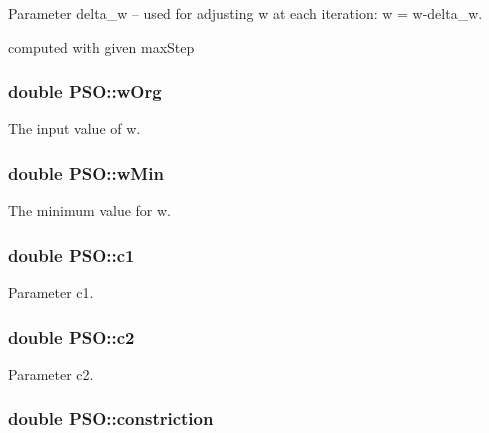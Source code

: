 Parameter delta\_\-w -- used for adjusting w at each iteration: w = w-delta\_\-w. 

computed with given maxStep \hypertarget{classPSO_a6b6a93e21e3011a966cb66264400327}{
\subsubsection{\setlength{\rightskip}{0pt plus 5cm}double {\bf PSO::wOrg}}}
\label{classPSO_a6b6a93e21e3011a966cb66264400327}


The input value of w. 

\hypertarget{classPSO_7c310fe0c71329a6bde8fba9928e99ab}{
\subsubsection{\setlength{\rightskip}{0pt plus 5cm}double {\bf PSO::wMin}}}
\label{classPSO_7c310fe0c71329a6bde8fba9928e99ab}


The minimum value for w. 

\hypertarget{classPSO_6fd910b80d2ffb471ee644cf565e2d47}{
\subsubsection{\setlength{\rightskip}{0pt plus 5cm}double {\bf PSO::c1}}}
\label{classPSO_6fd910b80d2ffb471ee644cf565e2d47}


Parameter c1. 

\hypertarget{classPSO_9c4540417d09f1b9cbb5779051842354}{
\subsubsection{\setlength{\rightskip}{0pt plus 5cm}double {\bf PSO::c2}}}
\label{classPSO_9c4540417d09f1b9cbb5779051842354}


Parameter c2. 

\hypertarget{classPSO_a7494b1abcbf4f8808237dbd089433de}{
\subsubsection{\setlength{\rightskip}{0pt plus 5cm}double {\bf PSO::constriction}}}
\label{classPSO_a7494b1abcbf4f8808237dbd089433de}


